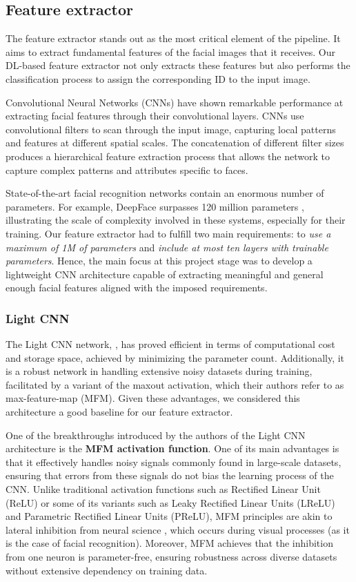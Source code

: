 \documentclass[11pt, a4paper]{article}
\numberwithin{equation}{subsection}
\begin{document}
\subsection{Feature extractor}\label{feature_extractor_section}

The feature extractor stands out as the most critical element of the pipeline. It aims to extract fundamental features of the facial images that it receives. Our DL-based feature extractor not only extracts these features but also performs the classification process to assign the corresponding ID to the input image.

Convolutional Neural Networks (CNNs) have shown remarkable performance at extracting facial features through their convolutional layers. CNNs use convolutional filters to scan through the input image, capturing local patterns and features at different spatial scales. The concatenation of different filter sizes produces a hierarchical feature extraction process that allows the network to capture complex patterns and attributes specific to faces.

State-of-the-art facial recognition networks contain an enormous number of parameters. For example, DeepFace surpasses 120 million parameters \cite{taigman2014deepface}, illustrating the scale of complexity involved in these systems, especially for their training. Our feature extractor had to fulfill two main requirements: to \textit{use a maximum of 1M of parameters} and \textit{include at most ten layers with trainable parameters}. Hence, the main focus at this project stage was to develop a lightweight CNN architecture capable of extracting meaningful and general enough facial features aligned with the imposed requirements.

\subsubsection{Light CNN}

The Light CNN network, \cite{wu2018light}, has proved efficient in terms of computational cost and storage space, achieved by minimizing the parameter count. Additionally, it is a robust network in handling extensive noisy datasets during training, facilitated by a variant of the maxout activation, which their authors refer to as max-feature-map (MFM). Given these advantages, we considered this architecture a good baseline for our feature extractor.

One of the breakthroughs introduced by the authors of the Light CNN architecture is the \textbf{MFM activation function}. One of its main advantages is that it effectively handles noisy signals commonly found in large-scale datasets, ensuring that errors from these signals do not bias the learning process of the CNN. Unlike traditional activation functions such as Rectified Linear Unit (ReLU) or some of its variants such as Leaky Rectified Linear Units (LReLU) and Parametric Rectified Linear Units (PReLU), MFM principles are akin to lateral inhibition from neural science \cite{wu2018light}, which occurs during visual processes (as it is the case of facial recognition). Moreover, MFM achieves that the inhibition from one neuron is parameter-free, ensuring robustness across diverse datasets without extensive dependency on training data.
\end{document}
